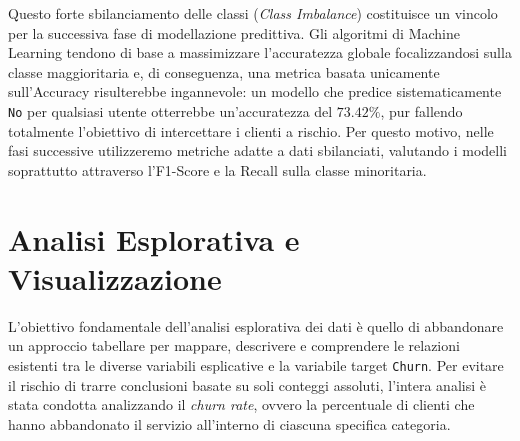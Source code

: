 \documentclass[11pt,a4paper]{article}
\begin{document}
Questo forte sbilanciamento delle classi (\textit{Class Imbalance}) costituisce un vincolo per la successiva fase di modellazione predittiva. Gli algoritmi di Machine Learning tendono di base a massimizzare l'accuratezza globale focalizzandosi sulla classe maggioritaria e, di conseguenza, una metrica basata unicamente sull'Accuracy risulterebbe ingannevole: un modello che predice sistematicamente \texttt{No} per qualsiasi utente otterrebbe un'accuratezza del $73.42\%$, pur fallendo totalmente l'obiettivo di intercettare i clienti a rischio. Per questo motivo, nelle fasi successive utilizzeremo metriche adatte a dati sbilanciati, valutando i modelli soprattutto attraverso l'F1-Score e la Recall sulla classe minoritaria.

\section{Analisi Esplorativa e Visualizzazione}
L'obiettivo fondamentale dell'analisi esplorativa dei dati è quello di abbandonare un approccio tabellare per mappare, descrivere e comprendere le relazioni esistenti tra le diverse variabili esplicative e la variabile target \texttt{Churn}. Per evitare il rischio di trarre conclusioni basate su soli conteggi assoluti, l'intera analisi è stata condotta analizzando il \textit{churn rate}, ovvero la percentuale di clienti che hanno abbandonato il servizio all'interno di ciascuna specifica categoria.
\end{document}
